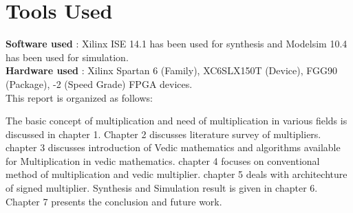 \section{Tools Used}

\textbf{Software used} : Xilinx ISE 14.1 has been used for synthesis and Modelsim 10.4 has been used for simulation.\\
\textbf{Hardware used} : Xilinx Spartan 6 (Family), XC6SLX150T (Device), FGG90 (Package), -2 (Speed Grade) FPGA devices.
\\

This report is organized as follows:

The basic concept of multiplication and need of multiplication in various fields is discussed in chapter 1. Chapter 2 discusses literature survey of multipliers. chapter 3 discusses introduction of Vedic mathematics and algorithms available for Multiplication in vedic mathematics. chapter 4 focuses on conventional method of multiplication and vedic multiplier. chapter 5 deals with architechture of signed multiplier. Synthesis and Simulation result is given in chapter 6. Chapter 7 presents the conclusion and future work.

